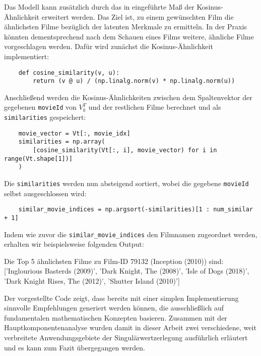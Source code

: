 Das Modell kann zusätzlich durch das in  eingeführte Maß der Kosinus-Ähnlichkeit erweitert werden.
Das Ziel ist, zu einem gewünschten Film die ähnlichsten Filme bezüglich der latenten Merkmale zu ermitteln.
In der Praxis könnten dementsprechend nach dem Schauen eines Films weitere, ähnliche Filme vorgeschlagen werden.
Dafür wird zunächst die Kosinus-Ähnlichkeit implementiert:
\begin{verbatim}
    def cosine_similarity(v, u):
        return (v @ u) / (np.linalg.norm(v) * np.linalg.norm(u))
\end{verbatim}
Anschließend werden die Kosinus-Ähnlichkeiten zwischen dem Spaltenvektor der gegebenen \texttt{movieId} von \(V_{k}^{T}\) und der restlichen Filme berechnet und als \texttt{similarities} gespeichert:
\begin{verbatim}
    movie_vector = Vt[:, movie_idx]
    similarities = np.array(
        [cosine_similarity(Vt[:, i], movie_vector) for i in range(Vt.shape[1])]
    )
\end{verbatim}
Die \texttt{similarities} werden nun absteigend sortiert, wobei die gegebene \texttt{movieId} selbst ausgeschlossen wird:
\begin{verbatim}
    similar_movie_indices = np.argsort(-similarities)[1 : num_similar + 1]
\end{verbatim} 
Indem wie zuvor die \texttt{similar_movie_indices} den Filmnamen zugeordnet werden, erhalten wir beispielsweise folgenden Output:
\begin{outputcode}
    Die Top 5 ähnlichsten Filme zu Film-ID 79132 (Inception (2010)) sind: ['Inglourious Basterds (2009)', 'Dark Knight, The (2008)', 'Isle of Dogs (2018)', 'Dark Knight Rises, The (2012)', 'Shutter Island (2010)']
\end{outputcode}
Der vorgestellte Code zeigt, dass bereits mit einer simplen Implementierung sinnvolle Empfehlungen generiert werden können, die ausschließlich auf fundamentalen mathematischen Konzepten basieren.
Zusammen mit der Hauptkomponentenanalyse wurden damit in dieser Arbeit zwei verschiedene, weit verbreitete Anwendungsgebiete der Singulärwertzerlegung ausführlich erläutert und es kann zum Fazit übergegangen werden.
